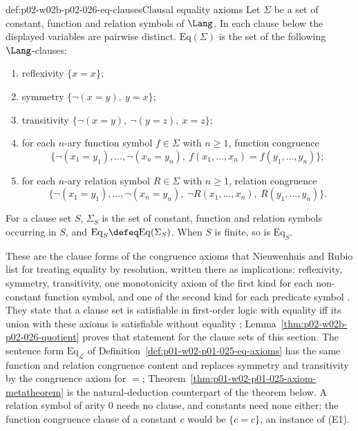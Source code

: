 \begin{hbdefinition}{def:p02-w02b-p02-026-eq-clauses}{Clausal equality axioms}
Let \(\Sigma\) be a set of constant, function and relation symbols of
\(\Lang\).  In each clause below the displayed variables are pairwise
distinct.  \(\mathrm{Eq}(\Sigma)\) is the set of the following
\(\Lang\)-clauses:
\begin{enumerate}
  \item[(E1)] reflexivity \(\{x=x\}\);
  \item[(E2)] symmetry \(\{\neg(x=y),\ y=x\}\);
  \item[(E3)] transitivity \(\{\neg(x=y),\ \neg(y=z),\ x=z\}\);
  \item[(E4)] for each \(n\)-ary function symbol \(f\in\Sigma\) with
        \(n\geq1\), function congruence
        \[
         \{\neg(x_1=y_1),\ldots,\neg(x_n=y_n),\
           f(x_1,\ldots,x_n)=f(y_1,\ldots,y_n)\};
        \]
  \item[(E5)] for each \(n\)-ary relation symbol \(R\in\Sigma\) with
        \(n\geq1\), relation congruence
        \[
         \{\neg(x_1=y_1),\ldots,\neg(x_n=y_n),\
           \neg R(x_1,\ldots,x_n),\ R(y_1,\ldots,y_n)\}.
        \]
\end{enumerate}
For a clause set \(S\), \(\Sigma_S\) is the set of constant, function and
relation symbols occurring in \(S\), and
\(\mathrm{Eq}_S\defeq\mathrm{Eq}(\Sigma_S)\).  When \(S\) is finite, so is
\(\mathrm{Eq}_S\).
\end{hbdefinition}

These are the clause forms of the congruence axioms that Nieuwenhuis and
Rubio list for treating equality by resolution, written there as
implications: reflexivity, symmetry, transitivity, one monotonicity axiom of
the first kind for each non-constant function symbol, and one of the second
kind for each predicate symbol \cite[\S1.1, p.~3]{NieuwenhuisRubio2001Typescript}.
They state that a clause set is satisfiable in first-order logic with
equality iff its union with these axioms is satisfiable without equality
\cite[\S1.1, p.~4]{NieuwenhuisRubio2001Typescript};
Lemma~\ref{thm:p02-w02b-p02-026-quotient} proves that statement for the
clause sets of this section.  The sentence form
\(\mathrm{Eq}_{\mathcal L}\) of Definition~\ref{def:p01-w02-p01-025-eq-axioms}
has the same function and relation congruence content and replaces symmetry
and transitivity by the congruence axiom for \(=\);
Theorem~\ref{thm:p01-w02-p01-025-axiom-metatheorem} is the natural-deduction
counterpart of the theorem below.  A relation symbol of arity \(0\) needs no
clause, and constants need none either: the function congruence clause of a
constant \(c\) would be \(\{c=c\}\), an instance of (E1).

